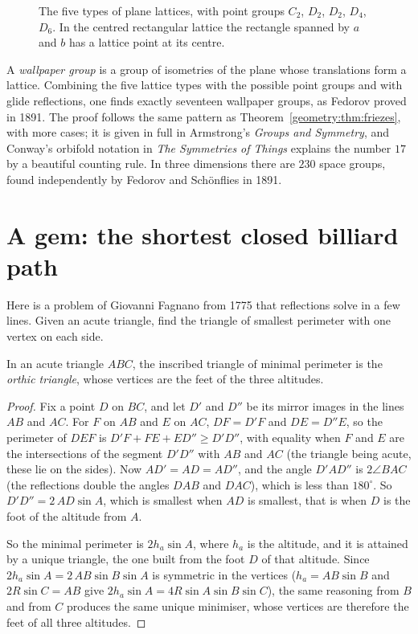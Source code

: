 \begin{figure}[ht]
\centering
{}
\caption{The five types of plane lattices, with point groups $C_2$, $D_2$, $D_2$, $D_4$, $D_6$. In the centred rectangular lattice the
rectangle spanned by $a$ and $b$ has a lattice point at its centre.}
\label{geometry:fig:lattices}
\end{figure}

\begin{remark}
A \emph{wallpaper group} is a group of isometries of the plane whose translations form a lattice. Combining the five lattice types with
the possible point groups and with glide reflections, one finds exactly seventeen wallpaper groups, as Fedorov proved in 1891. The proof
follows the same pattern as Theorem~\ref{geometry:thm:friezes}, with more cases; it is given in full in Armstrong's \emph{Groups and Symmetry}, and Conway's orbifold notation in \emph{The Symmetries of Things} explains the number $17$ by a beautiful counting rule. In
three dimensions there are $230$ space groups, found independently by Fedorov and Sch\"onflies in 1891.
\end{remark}

\section{A gem: the shortest closed billiard path}

Here is a problem of Giovanni Fagnano from 1775 that reflections solve in a few lines. Given an acute triangle, find the triangle of
smallest perimeter with one vertex on each side.

\begin{theorem}[Fagnano]\label{geometry:thm:fagnano}
In an acute triangle $ABC$, the inscribed triangle of minimal perimeter is the \emph{orthic triangle}, whose vertices are the feet of the
three altitudes.
\end{theorem}
\begin{proof}
Fix a point $D$ on $BC$, and let $D'$ and $D''$ be its mirror images in the lines $AB$ and $AC$. For $F$ on $AB$ and $E$ on $AC$,
$DF=D'F$ and $DE=D''E$, so the perimeter of $DEF$ is $D'F+FE+ED''\ge D'D''$, with equality when $F$ and $E$ are the intersections of the
segment $D'D''$ with $AB$ and $AC$ (the triangle being acute, these lie on the sides). Now $AD'=AD=AD''$, and the angle $D'AD''$ is
$2\angle BAC$ (the reflections double the angles $DAB$ and $DAC$), which is less than $180^\circ$. So $D'D''=2\,AD\sin A$, which is smallest
when $AD$ is smallest, that is when $D$ is the foot of the altitude from $A$.

So the minimal perimeter is $2h_a\sin A$, where $h_a$ is the altitude, and it is attained by a unique triangle, the one built from the
foot $D$ of that altitude. Since $2h_a\sin A=2\,AB\sin B\sin A$ is symmetric in the vertices ($h_a=AB\sin B$ and $2R\sin C=AB$ give
$2h_a\sin A=4R\sin A\sin B\sin C$), the same reasoning from $B$ and from $C$ produces the same unique minimiser, whose vertices are therefore
the feet of all three altitudes.
\end{proof}

